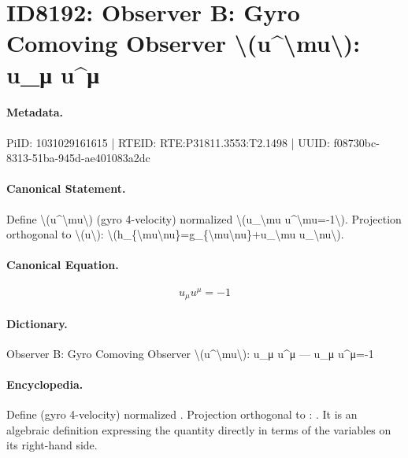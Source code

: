\section*{ID8192: Observer B: Gyro Comoving Observer \textbackslash{}(u\textasciicircum{}\textbackslash{}mu\textbackslash{}): u\_μ u\textasciicircum{}μ}
\paragraph{Metadata.}
PiID: 1031029161615 | RTEID: RTE:P31811.3553:T2.1498 | UUID: f08730bc-8313-51ba-945d-ae401083a2dc

\paragraph{Canonical Statement.}
Define \textbackslash{}(u\textasciicircum{}\textbackslash{}mu\textbackslash{}) (gyro 4-velocity) normalized \textbackslash{}(u\_\textbackslash{}mu u\textasciicircum{}\textbackslash{}mu=-1\textbackslash{}). Projection orthogonal to \textbackslash{}(u\textbackslash{}): \textbackslash{}(h\_\{\textbackslash{}mu\textbackslash{}nu\}=g\_\{\textbackslash{}mu\textbackslash{}nu\}+u\_\textbackslash{}mu u\_\textbackslash{}nu\textbackslash{}).

\paragraph{Canonical Equation.}
\[
u_\mu u^\mu=-1
\]

\paragraph{Dictionary.}
Observer B: Gyro Comoving Observer \textbackslash{}(u\textasciicircum{}\textbackslash{}mu\textbackslash{}): u\_μ u\textasciicircum{}μ — u\_μ u\textasciicircum{}μ=-1

\paragraph{Encyclopedia.}
Define (gyro 4-velocity) normalized . Projection orthogonal to : . It is an algebraic definition expressing the quantity directly in terms of the variables on its right-hand side.

